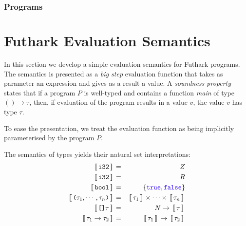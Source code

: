 \documentclass[11pt]{book}
\begin{document}


\subsubsection*{Programs }



\section{Futhark Evaluation Semantics}

In this section we develop a simple evaluation semantics for Futhark
programs. The semantics is presented as a \emph{big step} evaluation
function that takes as parameter an expression and gives as a result a
value. A \emph{soundness property} states that if a program $P$ is
well-typed and contains a function \emph{main} of type $() \rightarrow
\tau$, then, if evaluation of the program results in a value $v$, the
value $v$ has type $\tau$.

To ease the presentation, we treat the evaluation function as being
implicitly parameterised by the program $P$. %

\newcommand{\Eval}[1]{\,\sem{\,#1\,}\,}
\newcommand{\extractF}[1]{\langle\,#1\,\rangle}
\newcommand{\Let}{\mathrm{let}}
\newcommand{\Where}[1]{\mathrm{where} \begin{array}[t]{l} #1 \end{array}}
\newcommand{\In}{\mathrm{in}}
\newcommand{\N}{N}
\newcommand{\Z}{Z}
\newcommand{\R}{R}
The semantics of types yields their natural set interpretations:
\begin{eqnarray*}
  \Eval{\kw{i32}} & = & \Z \\
  \Eval{\kw{i32}} & = & \R \\
  \Eval{\kw{bool}} & = & \{\fop{true},\fop{false}\} \\
  \Eval{\kw{(}\tau_1,\cdots,\tau_n\kw{)}} & = & \Eval{\tau_1} \times \cdots \times \Eval{\tau_n} \\
  \Eval{\kw{[]}\tau} & = & \N \rightarrow \Eval{\tau} \\
  \Eval{\tau_1 \rightarrow \tau_2} & = & \Eval{\tau_1} \rightarrow \Eval{\tau_2}
\end{eqnarray*}
\end{document}

